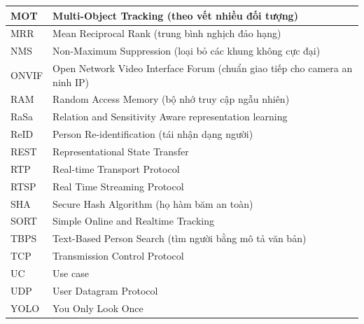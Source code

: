 \begin{longtable}{|p{3cm}|p{11cm}|}
\hline
MOT & Multi-Object Tracking (theo vết nhiều đối tượng) \\
\hline
MRR & Mean Reciprocal Rank (trung bình nghịch đảo hạng) \\
\hline
NMS & Non-Maximum Suppression (loại bỏ các khung không cực đại) \\
\hline
ONVIF & Open Network Video Interface Forum (chuẩn giao tiếp cho camera an ninh IP) \\
\hline
RAM & Random Access Memory (bộ nhớ truy cập ngẫu nhiên) \\
\hline
RaSa & Relation and Sensitivity Aware representation learning \\
\hline
ReID & Person Re-identification (tái nhận dạng người) \\
\hline
REST & Representational State Transfer \\
\hline
RTP & Real-time Transport Protocol \\
\hline
RTSP & Real Time Streaming Protocol \\
\hline
SHA & Secure Hash Algorithm (họ hàm băm an toàn) \\
\hline
SORT & Simple Online and Realtime Tracking \\
\hline
TBPS & Text-Based Person Search (tìm người bằng mô tả văn bản) \\
\hline
TCP & Transmission Control Protocol \\
\hline
UC & Use case \\
\hline
UDP & User Datagram Protocol \\
\hline
YOLO & You Only Look Once \\
\hline
\end{longtable}
